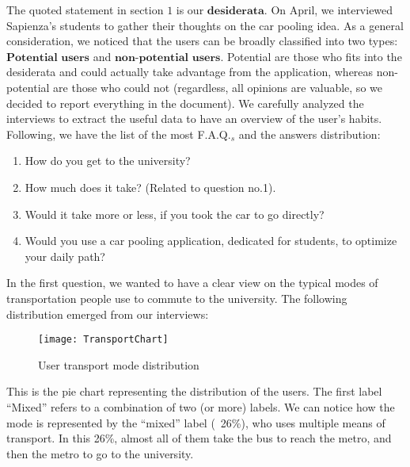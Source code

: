 \documentclass{article}
\begin{document}
The quoted statement in section $1$ is our $\textbf{desiderata}$. On April, we interviewed Sapienza's students to gather their thoughts on the car pooling idea. As a general consideration, we noticed that the users can be broadly classified into two types: $\textbf{Potential users}$ and $\textbf{non-potential users}$. Potential are those who fits into the desiderata and could actually take advantage from the application, whereas non-potential are those who could not (regardless, all opinions are valuable, so we decided to report everything in the document). We carefully analyzed the interviews to extract the useful data to have an overview of the user's habits. Following, we have the list of the most F.A.Q.$_{s}$ and the answers distribution: \newline 

\begin{enumerate}
    \item How do you get to the university? 
    \item How much does it take? (Related to question no.1).
    \item Would it take more or less, if you took the car to go directly?
    \item Would you use a car pooling application, dedicated for students, to optimize your daily path?
\end{enumerate} 

\newpage

In the first question, we wanted to have a clear view on the typical modes of transportation people use to commute to the university. The following distribution emerged from our interviews:

\begin{figure}[htbp]
  \centering
    \texttt{[image: TransportChart]}
    \caption{User transport mode distribution}
\end{figure}



This is the pie chart representing the distribution of the users. The first label “Mixed” refers to a combination of two (or more) labels. We can notice how the mode is represented by the “mixed” label (~26\%), who uses multiple means of transport. In this 26\%, almost all of them take the bus to reach the metro, and then the metro to go to the university.
\end{document}
